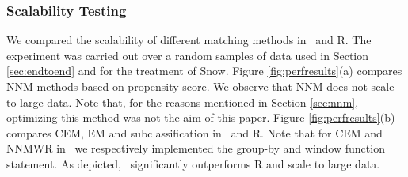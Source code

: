 \subsubsection{Scalability Testing}
\label{sec:sct}
We compared the scalability of different matching methods in \GSQL \ and R. The experiment was carried out over
a random samples of data used in Section \ref{sec:endtoend} and for the treatment of Snow. Figure \ref{fig:perfresults}(a) compares NNM methods based on propensity score. We observe that NNM does not scale to large data. Note that, for the reasons mentioned in Section \ref{sec:nnm}, optimizing this method was not the aim of this paper. Figure \ref{fig:perfresults}(b)  compares CEM, EM and subclassification in \GSQL \ and R. Note that for CEM and NNMWR in \GSQL\, we respectively implemented the group-by and window function statement. As depicted,  \GSQL \ significantly outperforms R and scale to large data.



